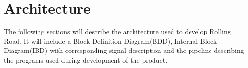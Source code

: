 \chapter{Architecture}
The following sections will describe the architecture used to develop Rolling Road. It will include a Block Definition Diagram(BDD), Internal Block Diagram(IBD) with corresponding signal description and the pipeline describing the programs used during development of the product.  





